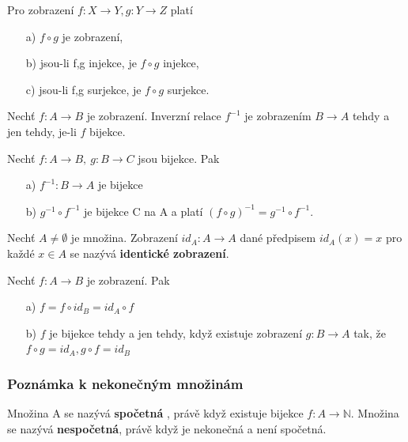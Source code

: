 \begin{sentence}
	Pro zobrazení $f : X \rightarrow Y, g : Y \rightarrow Z$ platí
	\begin{itemize}
		\item[a)] $f \circ g$ je zobrazení,
		\item[b)] jsou-li f,g injekce, je $f \circ g$ injekce,
		\item[c)] jsou-li f,g surjekce, je $f \circ g$ surjekce.
	\end{itemize}
\end{sentence}

\begin{sentence}
	Nechť $f: A \rightarrow B$ je zobrazení. Inverzní relace $f^{-1}$ je zobrazením $B \rightarrow A$ tehdy a jen tehdy, je-li $f$ bijekce.
\end{sentence}

\begin{result}
	Nechť $f: A \rightarrow B, \ g: B \rightarrow C$ jsou bijekce. Pak
	\begin{itemize}
		\item[a)] $f^{-1} : B \rightarrow A$ je bijekce
		\item[b)] $g^{-1} \circ f^{-1}$ je bijekce C na A a platí $(f \circ g)^{-1} = g^{-1} \circ f^{-1}$.
	\end{itemize}
\end{result}

\begin{definition}
	Nechť $A \not= \emptyset$ je množina. Zobrazení $id_A : A \rightarrow A$ dané předpisem $id_A(x) = x$ pro každé $x \in A$ se nazývá \textbf{identické zobrazení}.
\end{definition}

\begin{definition}
	Nechť $f : A \rightarrow B$ je zobrazení. Pak
	\begin{itemize}
		\item[a)] $f = f \circ id_B = id_A \circ f$
		\item[b)] $f$ je bijekce tehdy a jen tehdy, když existuje zobrazení $g : B \rightarrow A$ tak, že $f \circ g = id_A, g \circ f = id_B$
	\end{itemize}
\end{definition}


\subsubsection{Poznámka k nekonečným množinám}
\begin{definition}
	Množina A se nazývá \textbf{spočetná} , právě když existuje bijekce $f : A \rightarrow \mathbb{N}$. Množina se nazývá \textbf{nespočetná}, právě když je nekonečná a není spočetná.
\end{definition}

